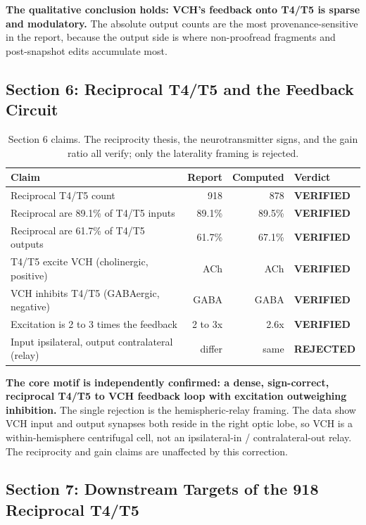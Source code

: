 \documentclass[11pt]{article}
\newcommand{\key}[1]{\textbf{#1}}
\newcommand{\Verify}{\textcolor{vgreen}{\textbf{VERIFIED}}}
\newcommand{\Reject}{\textcolor{vred}{\textbf{REJECTED}}}
\begin{document}
\key{The qualitative conclusion holds: VCH's feedback onto T4/T5 is sparse and
modulatory.} The absolute output counts are the most provenance-sensitive in the report,
because the output side is where non-proofread fragments and post-snapshot edits
accumulate most.

\subsection*{Section 6: Reciprocal T4/T5 and the Feedback Circuit}

\begin{table}[H]
\centering
\caption{Section 6 claims. The reciprocity thesis, the neurotransmitter signs, and the
gain ratio all verify; only the laterality framing is rejected.}
\begin{tabular}{p{6.6cm}rrl}
\toprule
Claim & Report & Computed & Verdict \\
\midrule
Reciprocal T4/T5 count & 918 & 878 & \Verify \\
Reciprocal are 89.1\% of T4/T5 inputs & 89.1\% & 89.5\% & \Verify \\
Reciprocal are 61.7\% of T4/T5 outputs & 61.7\% & 67.1\% & \Verify \\
T4/T5 excite VCH (cholinergic, positive) & ACh & ACh & \Verify \\
VCH inhibits T4/T5 (GABAergic, negative) & GABA & GABA & \Verify \\
Excitation is 2 to 3 times the feedback & 2 to 3x & 2.6x & \Verify \\
Input ipsilateral, output contralateral (relay) & differ & same & \Reject \\
\bottomrule
\end{tabular}
\end{table}

\key{The core motif is independently confirmed: a dense, sign-correct, reciprocal
T4/T5 to VCH feedback loop with excitation outweighing inhibition.} The single rejection
is the hemispheric-relay framing. The data show VCH input and output synapses both reside
in the right optic lobe, so VCH is a within-hemisphere centrifugal cell, not an
ipsilateral-in / contralateral-out relay. The reciprocity and gain claims are unaffected
by this correction.

\subsection*{Section 7: Downstream Targets of the 918 Reciprocal T4/T5}
\end{document}
